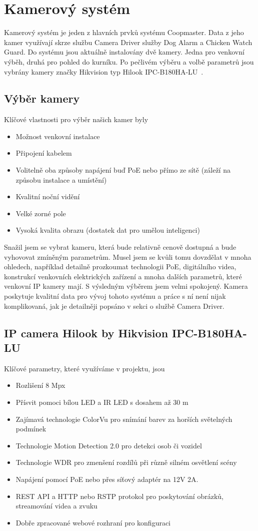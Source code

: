 \section{Kamerový systém}\label{sec:kamerovy-system}
Kamerový systém je jeden z hlavních prvků systému Coopmaster.
Data z jeho kamer využívají skrze službu Camera Driver služby Dog Alarm a Chicken Watch Guard.
Do systému jsou aktuálně instalovány dvě kamery. Jedna pro venkovní výběh, druhá pro pohled do kurníku.
Po pečlivém výběru a volbě parametrů jsou vybrány kamery značky Hikvision typ Hilook IPC-B180HA-LU~\cite{hikvisionkamera}.

\subsection*{Výběr kamery}
Klíčové vlastnosti pro výběr našich kamer byly
\begin{itemize}
    \item Možnost venkovní instalace
    \item Připojení kabelem
    \item Volitelně oba způsoby napájení buď PoE nebo přímo ze sítě (záleží na způsobu instalace a umístění)
    \item Kvalitní noční vidění
    \item Velké zorné pole
    \item Vysoká kvalita obrazu (dostatek dat pro umělou inteligenci)
\end{itemize}
Snažil jsem se vybrat kameru, která bude relativně cenově dostupná a bude vyhovovat zmíněným parametrům.
Musel jsem se kvůli tomu dovzdělat v mnoha ohledech, například detailně prozkoumat technologii PoE, digitálního videa, konstrukcí venkovních elektrických zařízení a mnoha dalších parametrů, které venkovní IP kamery mají.
S výsledným výběrem jsem velmi spokojený.
Kamera poskytuje kvalitní data pro vývoj tohoto systému a práce s ní není nijak komplikovaná, jak je detailněji popsáno v sekci o službě Camera Driver.

\subsection*{IP camera Hilook by Hikvision IPC-B180HA-LU}
Klíčové parametry, které využíváme v projektu, jsou
\begin{itemize}
    \item Rozlišení 8 Mpx
    \item Přísvit pomoci bílou LED a IR LED s dosahem až 30 m
    \item Zajímavá technologie ColorVu pro snímání barev za horších světelných podmínek
    \item Technologie Motion Detection 2.0 pro detekci osob či vozidel
    \item Technologie WDR pro zmenšení rozdílů při různě silném osvětlení scény
    \item Napájení pomocí PoE nebo přes síťový adaptér na 12V 2A.
    \item REST API a HTTP nebo RSTP protokol pro poskytování obrázků, streamování videa a zvuku
    \item Dobře zpracované webové rozhraní pro konfiguraci
\end{itemize}

%
%
%
